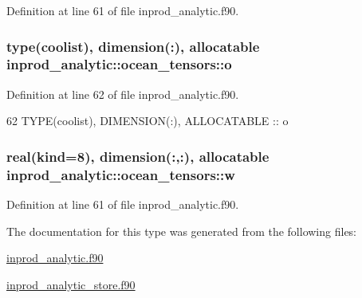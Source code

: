 Definition at line 61 of file inprod\+\_\+analytic.\+f90.

\subsubsection[{\texorpdfstring{o}{o}}]{\setlength{\rightskip}{0pt plus 5cm}type({\bf coolist}), dimension(\+:), allocatable inprod\+\_\+analytic\+::ocean\+\_\+tensors\+::o\hspace{0.3cm}{\ttfamily [private]}}\hypertarget{structinprod__analytic_1_1ocean__tensors_a03c7dc35fc732e1011937eb4c4568c2e}{}\label{structinprod__analytic_1_1ocean__tensors_a03c7dc35fc732e1011937eb4c4568c2e}


Definition at line 62 of file inprod\+\_\+analytic.\+f90.


\begin{DoxyCode}
62      \textcolor{keywordtype}{TYPE}(coolist), \textcolor{keywordtype}{DIMENSION(:)}, \textcolor{keywordtype}{ALLOCATABLE} :: o
\end{DoxyCode}
\subsubsection[{\texorpdfstring{w}{w}}]{\setlength{\rightskip}{0pt plus 5cm}real(kind=8), dimension(\+:,\+:), allocatable inprod\+\_\+analytic\+::ocean\+\_\+tensors\+::w\hspace{0.3cm}{\ttfamily [private]}}\hypertarget{structinprod__analytic_1_1ocean__tensors_ae4875d9d3ea854b3b7b57e0c07a07ede}{}\label{structinprod__analytic_1_1ocean__tensors_ae4875d9d3ea854b3b7b57e0c07a07ede}


Definition at line 61 of file inprod\+\_\+analytic.\+f90.



The documentation for this type was generated from the following files\+:\begin{DoxyCompactItemize}
\item 
\hyperlink{inprod__analytic_8f90}{inprod\+\_\+analytic.\+f90}\item 
\hyperlink{inprod__analytic__store_8f90}{inprod\+\_\+analytic\+\_\+store.\+f90}\end{DoxyCompactItemize}
